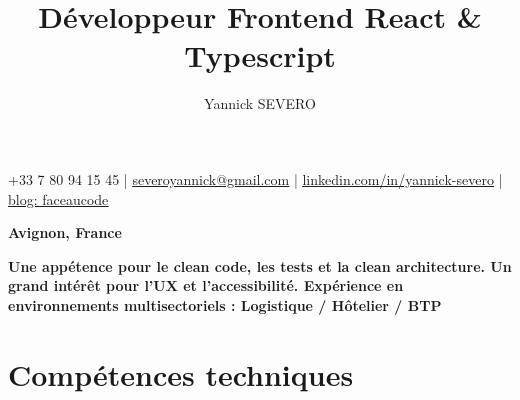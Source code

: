 \documentclass{article}
\title{Développeur Frontend React \& Typescript}
\author{Yannick SEVERO}
\date{}
\begin{document}
\maketitle
\thispagestyle{empty} %
\vspace{-4em}

\begin{center}
+33 7 80 94 15 45 | \href{mailto:severoyannick@gmail.com}{\underline{severoyannick@gmail.com}} | \href{https://linkedin.com/in/yannick-severo}{\underline{linkedin.com/in/yannick-severo}} | \href{https://www.faceaucode.com/}{\underline{blog: faceaucode}}
\end{center}
\begin{center}
\textbf{Avignon, France}
\end{center}


\begin{center}
\textbf{Une appétence pour le clean code, les tests et la clean architecture. Un grand intérêt pour l'UX et l'accessibilité. Expérience en environnements multisectoriels : Logistique / Hôtelier / BTP}
\end{center}

\section*{Compétences techniques}
\end{document}
